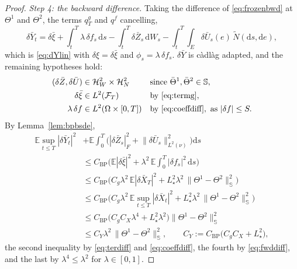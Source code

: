 \documentclass[preprint,12pt]{elsarticle}
\newcommand{\E}{\mathbb{E}}
\newcommand{\F}{\mathcal{F}}
\newcommand{\diff}{\mathrm{d}}
\newcommand{\Nt}{\widetilde{N}}
\newcommand{\Lnu}{L^2(\nu)}
\newcommand{\HH}{\mathbb{S}}
\newcommand{\HW}{\mathcal{H}^2_W}
\newcommand{\HN}{\mathcal{H}^2_N}
\newcommand{\Lnorm}[1]{\lVert #1\rVert_{\Lnu}}
\numberwithin{equation}{section}
\theoremstyle{plain}
\theoremstyle{definition}
\theoremstyle{\PaperRemarkStyle}
\begin{document}
\begin{proof}
\emph{Step 4: the backward difference.} Taking the difference of \eqref{eq:frozenbwd} at
$\Theta^1$ and $\Theta^2$, the terms $q^g_T$ and $q^f$ cancelling,
\[
\delta\bar Y_t=\delta\bar\xi+\int_t^T\!\lambda\,\delta f_s\,\diff s
-\int_t^T\!\delta\bar Z_s\,\diff W_s-\int_t^T\!\!\int_E\delta\bar U_s(e)\,\Nt(\diff s,\diff e) ,
\]
which is \eqref{eq:dYlin} with $\delta\xi=\delta\bar\xi$ and $\phi_s=\lambda\,\delta f_s$.
$\delta\bar Y$ is c\`adl\`ag adapted, and the remaining hypotheses hold:
\[
\begin{alignedat}{2}
(\delta\bar Z,\delta\bar U)&\in\HW\times\HN
&\quad&\text{since }\bar\Theta^1,\bar\Theta^2\in\HH,\\
\delta\bar\xi&\in L^2(\F_T) &&\text{by }\eqref{eq:termg},\\
\lambda\,\delta f&\in L^2(\Omega\times[0,T]) &&\text{by }\eqref{eq:coeffdiff},
\text{ as }|\delta f|\le S.
\end{alignedat}
\]
By Lemma~\ref{lem:bpbsde},
\begin{equation}\label{eq:bwddiff}
\begin{aligned}
\E\sup_{t\le T}|\delta\bar Y_t|^2
&+\E\!\int_0^T\!\big(|\delta\bar Z_s|_F^2+\Lnorm{\delta\bar U_s}^2\big)\diff s\\
&\le C_{\mathrm{BP}}\Big(\E|\delta\bar\xi|^2+\lambda^2\,\E\!\int_0^T\!|\delta f_s|^2\,\diff s\Big)\\
&\le C_{\mathrm{BP}}\Big(C_g\lambda^2\,\E|\delta\bar X_T|^2
+L_\star^2\lambda^2\,\|\Theta^1-\Theta^2\|_{\HH}^2\Big)\\
&\le C_{\mathrm{BP}}\Big(C_g\lambda^2\,\E\sup_{t\le T}|\delta\bar X_t|^2
+L_\star^2\lambda^2\,\|\Theta^1-\Theta^2\|_{\HH}^2\Big)\\
&\le C_{\mathrm{BP}}\big(C_gC_X\lambda^4+L_\star^2\lambda^2\big)\|\Theta^1-\Theta^2\|_{\HH}^2\\
&\le C_Y\lambda^2\,\|\Theta^1-\Theta^2\|_{\HH}^2 ,
\qquad C_Y:=C_{\mathrm{BP}}\big(C_gC_X+L_\star^2\big) ,
\end{aligned}
\end{equation}
the second inequality by \eqref{eq:terdiff} and \eqref{eq:coeffdiff}, the fourth by
\eqref{eq:fwddiff}, and the last by $\lambda^4\le\lambda^2$ for $\lambda\in[0,1]$.


\end{proof}
\end{document}
